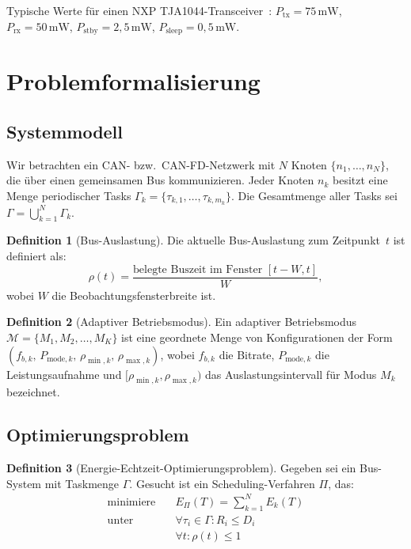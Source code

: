 ﻿\documentclass[a4paper,12pt]{article}
\theoremstyle{definition}
\newtheorem{definition}{Definition}
\begin{document}
Typische Werte f\"{u}r einen NXP TJA1044-Transceiver~\cite{nxp_tja}:
$P_{\mathrm{tx}} = 75\,\text{mW}$,
$P_{\mathrm{rx}} = 50\,\text{mW}$,
$P_{\mathrm{stby}} = 2{,}5\,\text{mW}$,
$P_{\mathrm{sleep}} = 0{,}5\,\text{mW}$.

\section{Problemformalisierung}

\subsection{Systemmodell}

Wir betrachten ein CAN- bzw.\ CAN-FD-Netzwerk mit $N$ Knoten $\{n_1, \ldots, n_N\}$,
die \"{u}ber einen gemeinsamen Bus kommunizieren.
Jeder Knoten $n_k$ besitzt eine Menge periodischer Tasks
$\Gamma_k = \{\tau_{k,1}, \ldots, \tau_{k,m_k}\}$.
Die Gesamtmenge aller Tasks sei $\Gamma = \bigcup_{k=1}^{N} \Gamma_k$.

\begin{definition}[Bus-Auslastung]
Die aktuelle Bus-Auslastung zum Zeitpunkt~$t$ ist definiert als:
\[
    \rho(t) = \frac{\text{belegte Buszeit im Fenster } [t - W, t]}{W},
\]
wobei $W$ die Beobachtungsfensterbreite ist.
\end{definition}

\begin{definition}[Adaptiver Betriebsmodus]
Ein adaptiver Betriebsmodus $\mathcal{M} = \{M_1, M_2, \ldots, M_K\}$ ist eine
geordnete Menge von Konfigurationen der Form
$(f_{b,k},\, P_{\mathrm{mode},k},\, \rho_{\min,k},\, \rho_{\max,k})$,
wobei $f_{b,k}$ die Bitrate, $P_{\mathrm{mode},k}$ die Leistungsaufnahme und
$[\rho_{\min,k}, \rho_{\max,k})$ das Auslastungsintervall f\"{u}r Modus $M_k$ bezeichnet.
\end{definition}

\subsection{Optimierungsproblem}

\begin{definition}[Energie-Echtzeit-Optimierungsproblem]
Gegeben sei ein Bus-System mit Taskmenge $\Gamma$.
Gesucht ist ein Scheduling-Verfahren $\Pi$, das:
\begin{align}
    \text{minimiere} \quad & E_{\Pi}(T) = \sum_{k=1}^{N} E_k(T) \tag{P1} \\
    \text{unter} \quad     & \forall \tau_i \in \Gamma: R_i \leq D_i \tag{C1}\\
                           & \forall t: \rho(t) \leq 1 \tag{C2}
\end{align}
\end{definition}
\end{document}
